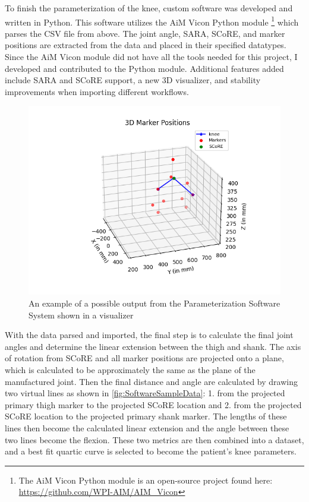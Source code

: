 To finish the parameterization of the knee, custom software was developed and written in Python. This software utilizes the AiM Vicon Python module \footnote{The AiM Vicon Python module is an open-source project found here: \url{https://github.com/WPI-AIM/AIM_Vicon}} which parses the CSV file from above. The joint angle, SARA, SCoRE, and marker positions are extracted from the data and placed in their specified datatypes. Since the AiM Vicon module did not have all the tools needed for this project, I developed and contributed to the Python module. Additional features added include SARA and SCoRE support, a new 3D visualizer, and stability improvements when importing different workflows.

\begin{figure}[ht!]
    \centering
    \includegraphics[width=\textwidth]{Figures/Param/3D_Marker_Animation.png}
    \caption{An example of a possible output from the Parameterization Software System shown in a visualizer}
    \label{fig:SoftwareSampleData}
\end{figure}

With the data parsed and imported, the final step is to calculate the final joint angles and determine the linear extension between the thigh and shank. The axis of rotation from SCoRE and all marker positions are projected onto a plane, which is calculated to be approximately the same as the plane of the manufactured joint. Then the final distance and angle are calculated by drawing two virtual lines as shown in \autoref{fig:SoftwareSampleData}: 1. from the projected primary thigh marker to the projected SCoRE location and 2. from the projected SCoRE location to the projected primary shank marker. The lengths of these lines then become the calculated linear extension and the angle between these two lines become the flexion. These two metrics are then combined into a dataset, and a best fit quartic curve is selected to become the patient's knee parameters.

